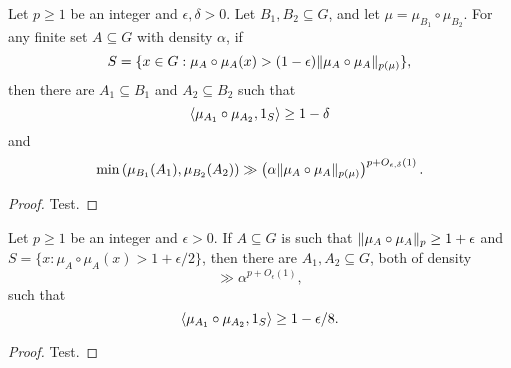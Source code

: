\begin{lemma}\label{local_drc}
Let $p\geq 1$ be an integer and $\epsilon,\delta>0$. Let $B_1,B_2\subseteq G$, and let $\mu=\mu_{B_1}\circ\mu_{B_2}$. For any finite set $A\subseteq G$ with density $\alpha$, if 
\[S=\{ x\in G: \mu_A\circ \mu_A(x)>(1-\epsilon)\lVert \mu_A\circ \mu_A\rVert_{p(\mu)}\},\]
then there are $A_1\subseteq B_1$ and $A_2\subseteq B_2$ such that 
\[\langle \mu_{A_1}\circ\mu_{A_2},1_{S}\rangle \geq 1-\delta\]
and
\[\min\left( \mu_{B_1}(A_1),\mu_{B_2}(A_2)\right)\gg \left( \alpha\lVert \mu_A\circ \mu_A\rVert_{p(\mu)}\right)^{p+O_{\epsilon,\delta}(1)}.\]
\end{lemma}
\begin{proof}
Test.
\end{proof}

\begin{corollary}\label{global_drc}
Let $p\geq 1$ be an integer and $\epsilon>0$. If $A\subseteq G$ is such that $\lVert \mu_A\circ \mu_A\rVert_p \geq 1+\epsilon$ and $S=\{ x : \mu_A\circ \mu_A(x)>1+\epsilon/2\}$, then there are $A_1,A_2\subseteq G$, both of density
\[\gg \alpha^{p+O_\epsilon(1)},\]
such that
\[\langle \mu_{A_1}\circ \mu_{A_2},1_{S}\rangle \geq 1-\epsilon/8.\]
\end{corollary}
\begin{proof}
Test.
\end{proof}